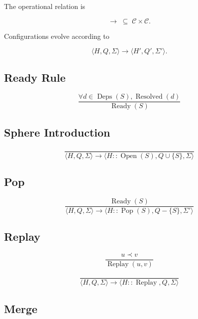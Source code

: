 \documentclass[12pt,oneside]{article}
\theoremstyle{definition}
\theoremstyle{remark}
\begin{document}
The operational relation is

\[
\longrightarrow
\;\subseteq\;
\mathcal C
\times
\mathcal C.
\]

Configurations evolve according to

\[
\langle
H,Q,\Sigma
\rangle
\longrightarrow
\langle
H',Q',\Sigma'
\rangle.
\]

\subsection*{Ready Rule}

\[
\frac
{\forall
d\in
\operatorname{Deps}(S),
\operatorname{Resolved}(d)}
{\operatorname{Ready}(S)}
\]

\subsection*{Sphere Introduction}

\[
\frac{}
{\langle
H,Q,\Sigma
\rangle
\longrightarrow
\langle
H::\operatorname{Open}(S),
Q\cup\{S\},
\Sigma
\rangle}
\]

\subsection*{Pop}

\[
\frac
{\operatorname{Ready}(S)}
{\langle
H,Q,\Sigma
\rangle
\longrightarrow
\langle
H::\operatorname{Pop}(S),
Q-\{S\},
\Sigma'
\rangle}
\]

\subsection*{Replay}

\[
\frac
{u\prec v}
{\operatorname{Replay}(u,v)}
\]

\[
\frac
{}
{\langle
H,Q,\Sigma
\rangle
\longrightarrow
\langle
H::\operatorname{Replay},
Q,
\Sigma
\rangle}
\]

\subsection*{Merge}
\end{document}
